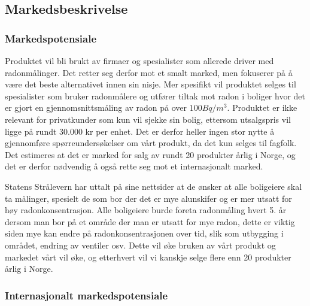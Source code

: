 \subsection{Markedsbeskrivelse}

\subsubsection{Markedspotensiale}

Produktet vil bli brukt av firmaer og spesialister som allerede driver med radonmålinger. Det retter seg derfor mot et smalt marked, men fokuserer på å være det beste alternativet innen sin nisje. Mer spesifikt vil produktet selges til spesialister som bruker radonmålere og utfører tiltak mot radon i boliger hvor det er gjort en gjennomsnittsmåling av radon på over $100 Bq/m^3$. Produktet er ikke relevant for privatkunder som kun vil sjekke sin bolig, ettersom utsalgspris vil ligge på rundt 30.000 kr per enhet. Det er derfor heller ingen stor nytte å gjennomføre spørreundersøkelser om vårt produkt, da det kun selges til fagfolk. Det estimeres at det er marked for salg av rundt 20 produkter årlig i Norge, og det er derfor nødvendig å også rette seg mot et internasjonalt marked.

Statens Strålevern har uttalt på sine nettsider at de ønsker at alle boligeiere skal ta målinger, spesielt de som bor der det er mye alunskifer og er mer utsatt for høy radonkonsentrasjon.
Alle boligeiere burde foreta radonmåling hvert 5. år dersom man bor på et område der man er utsatt for mye radon, dette er viktig siden mye kan endre på radonkonsentrasjonen over tid, slik som utbygging i området, endring av ventiler osv.
Dette vil øke bruken av vårt produkt og markedet vårt vil øke, og etterhvert vil vi kanskje selge flere enn 20 produkter årlig i Norge.

\subsubsection{Internasjonalt markedspotensiale}

